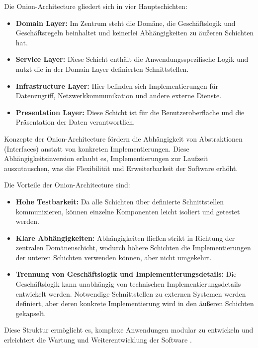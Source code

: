 \newpage

Die Onion-Architecture gliedert sich in vier Hauptschichten:

\begin{itemize}
\item \textbf{Domain Layer:} Im Zentrum steht die Domäne, die Geschäftslogik und Geschäftsregeln beinhaltet und keinerlei Abhängigkeiten zu äußeren Schichten hat.
\item \textbf{Service Layer:} Diese Schicht enthält die Anwendungsspezifische Logik und nutzt die in der Domain Layer definierten Schnittstellen.
\item \textbf{Infrastructure Layer:} Hier befinden sich Implementierungen für Datenzugriff, Netzwerkkommunikation und andere externe Dienste.
\item \textbf{Presentation Layer:} Diese Schicht ist für die Benutzeroberfläche und die Präsentation der Daten verantwortlich.
\end{itemize}

Konzepte der Onion-Architecture fördern die Abhängigkeit von Abstraktionen (Interfaces) anstatt von konkreten Implementierungen. Diese Abhängigkeitsinversion erlaubt es, Implementierungen zur Laufzeit auszutauschen, was die Flexibilität und Erweiterbarkeit der Software erhöht.

Die Vorteile der Onion-Architecture sind:

\begin{itemize}
\item \textbf{Hohe Testbarkeit:} Da alle Schichten über definierte Schnittstellen kommunizieren, können einzelne Komponenten leicht isoliert und getestet werden.
\item \textbf{Klare Abhängigkeiten:} Abhängigkeiten fließen strikt in Richtung der zentralen Domänenschicht, wodurch höhere Schichten die Implementierungen der unteren Schichten verwenden können, aber nicht umgekehrt.
\item \textbf{Trennung von Geschäftslogik und Implementierungsdetails:} Die Geschäftslogik kann unabhängig von technischen Implementierungsdetails entwickelt werden. Notwendige Schnittstellen zu externen Systemen werden definiert, aber deren konkrete Implementierung wird in den äußeren Schichten gekapselt.
\end{itemize}

Diese Struktur ermöglicht es, komplexe Anwendungen modular zu entwickeln und erleichtert die Wartung und Weiterentwicklung der Software \autocite{CodeMaze2024}.

